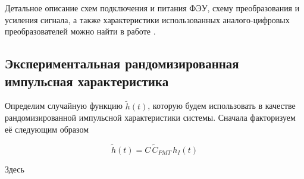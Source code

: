 \documentclass[12pt]{book}
\begin{document}
	Детальное описание схем подключения и питания ФЭУ, схему преобразования и усиления сигнала, а также характеристики использованных аналого-цифровых преобразователей можно найти в работе \cite{SphereDetector2020}.
	
	\subsection{Экспериментальная рандомизированная импульсная характеристика}

	Определим случайную функцию $\tilde{h}(t)$, которую будем использовать в качестве рандомизированной импульсной характеристики системы. Сначала факторизуем её следующим образом
	
	\begin{equation}
		\label{eq:experimental-rir}
		\tilde{h}(t) = C \, \tilde{C}_{PMT} \, h_I(t)
	\end{equation}

	Здесь
	
\end{document}
